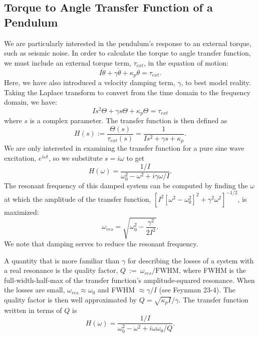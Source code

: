\subsection{Torque to Angle Transfer Function of a Pendulum}
\label{sec:t2a}
We are particularly interested in the pendulum's response to an
external torque, such as seismic noise. In order to calculate the
torque to angle transfer function, we must include an external torque
term, $\tau_{ext}$, in the equation of motion:
\begin{equation}
I \ddot{\theta} + \gamma \dot{\theta} + \kappa_p \theta = \tau_{ext}.
\label{eq:eqmotion}
\end{equation}
Here, we have also introduced a velocity damping term, $\gamma$, to
best model reality. Taking the Laplace transform to convert from the
time domain to the frequency domain, we have:
\begin{equation}
I s^2 \Theta + \gamma s \Theta + \kappa_p \Theta = \tau_{ext}
\end{equation}
where $s$ is a complex parameter. The transfer function is then
defined as
\begin{equation}
H(s) := \frac{\Theta(s)}{\tau_{ext}(s)} = \frac{1}{I s^2 + \gamma s + \kappa_p}.
\label{eq:TF}
\end{equation}
We are only interested in examining the transfer function for a pure
sine wave excitation, $e^{i\omega t}$, so we substitute $s=i\omega$ to
get
\begin{equation}
H(\omega) = \frac{1/I}{\omega_0^2  - \omega^2 + i \gamma \omega / I}.
\end{equation}
The resonant frequency of this damped system can be computed by finding the
$\omega$ at which the amplitude of the transfer function, $[I^2
[\omega^2 - \omega_0^2]^2 + \gamma^2 \omega^2]^{-1/2}$, is maximized:
\begin{equation}
\omega_{res} = \sqrt{\omega_0^2 - \frac{\gamma^2}{2I^2}}.
\end{equation}
We note that damping serves to reduce the resonant frequency.

A quantity that is more familiar than $\gamma$ for describing the losses of a system with a real resonance is the quality factor, $Q~:=~\omega_{res}/\mathrm{FWHM}$, where FWHM is the full-width-half-max of the transfer function's amplitude-squared resonance. When the losses are small, $\omega_{res} \approx \omega_0$ and FWHM $\approx \gamma/I$ (see Feynman 23-4). The quality factor is then well approximated by $Q = \sqrt{\kappa_p I}/\gamma$. The transfer function written in terms of $Q$ is \begin{equation} H(\omega) = \frac{1/I}{\omega_0^2 - \omega^2 + i \omega \omega_0 / Q}.  \label{eq:TFpendulum} \end{equation}

